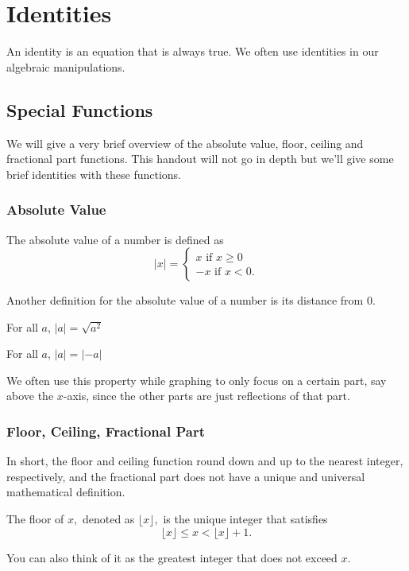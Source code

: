 \documentclass[mast]{lucky}
\begin{document}
\section{Identities}
An identity is an equation that is always true. We often use identities in our algebraic manipulations.
\subsection{Special Functions}
We will give a very brief overview of the absolute value, floor, ceiling and fractional part functions. This handout will not go in depth but we'll give some brief identities with these functions.
\subsubsection{Absolute Value}
\begin{defi}
The absolute value of a number is defined as
\[|x|=\begin{cases}
x\text{ if }x\geq 0 \\
-x\text{ if }x<0.
\end{cases}\]
\end{defi}
Another definition for the absolute value of a number is its distance from $0.$

\begin{theo}
For all $a$, $|a|=\sqrt{a^2}$
\end{theo}

\begin{theo}[Symmetric]
For all $a$, $|a|=|-a|$
\end{theo}

We often use this property while graphing to only focus on a certain part, say above the $x$-axis, since the other parts are just reflections of that part.
\subsubsection{Floor, Ceiling, Fractional Part}
In short, the floor and ceiling function round down and up to the nearest integer, respectively, and the fractional part does not have a unique and universal mathematical definition.

\begin{defi}[Floor]
The floor of $x,$ denoted as $\lfloor x\rfloor,$ is the unique integer that satisfies
\[\lfloor x\rfloor\leq x<\lfloor x\rfloor+1.\]
\end{defi}
You can also think of it as the greatest integer that does not exceed $x.$
\end{document}
